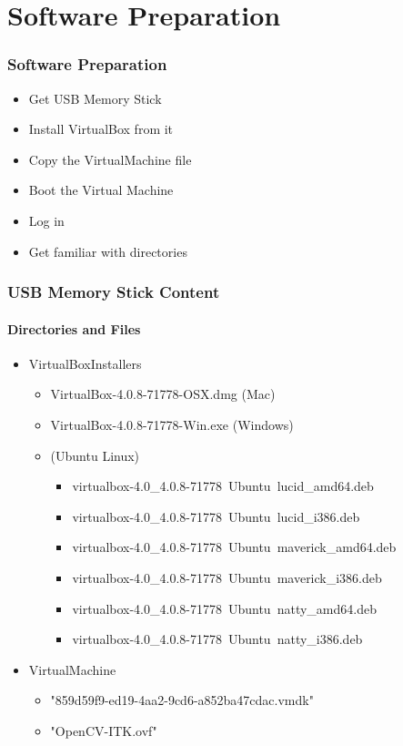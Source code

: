 \section{Software Preparation}


\begin{frame}
\frametitle{Software Preparation}
\begin{itemize}
\item Get USB Memory Stick
\pause
\item Install VirtualBox from it
\pause
\item Copy the VirtualMachine file
\pause
\item Boot the Virtual Machine
\pause
\item Log in
\pause
\item Get familiar with directories
\end{itemize}
\end{frame}


\begin{frame}
\frametitle{USB Memory Stick Content}
\framesubtitle{Directories and Files}
\begin{itemize}
\item VirtualBoxInstallers
\begin{itemize}
\item VirtualBox-4.0.8-71778-OSX.dmg (Mac)
\item VirtualBox-4.0.8-71778-Win.exe (Windows)
\item (Ubuntu Linux)
\begin{itemize}
\item virtualbox-4.0\_4.0.8-71778~Ubuntu~lucid\_amd64.deb
\item virtualbox-4.0\_4.0.8-71778~Ubuntu~lucid\_i386.deb
\item virtualbox-4.0\_4.0.8-71778~Ubuntu~maverick\_amd64.deb
\item virtualbox-4.0\_4.0.8-71778~Ubuntu~maverick\_i386.deb
\item virtualbox-4.0\_4.0.8-71778~Ubuntu~natty\_amd64.deb
\item virtualbox-4.0\_4.0.8-71778~Ubuntu~natty\_i386.deb
\end{itemize}
\end{itemize}
\pause
\item VirtualMachine
\begin{itemize}
\item  "{859d59f9-ed19-4aa2-9cd6-a852ba47cdac}.vmdk"
\item  "OpenCV-ITK.ovf"
\end{itemize}
\end{itemize}
\end{frame}

